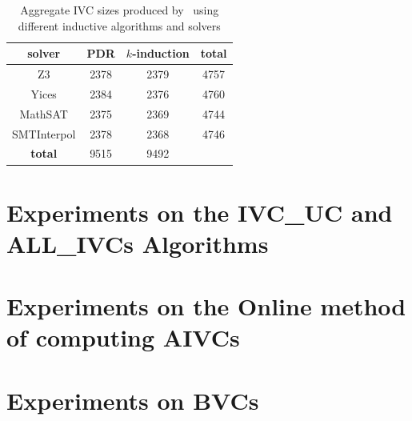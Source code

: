 
\begin{table}
  \caption{Aggregate IVC sizes produced by \ucalg\ using different inductive algorithms and solvers}
  \centering
  \begin{tabular}{ |c|c|c|c| }
    \hline
     solver & PDR & $k$-induction & \textbf{total} \\
    \hline
      Z3 & 2378 & 2379 & 4757 \\
      Yices & 2384 & 2376 & 4760 \\
      MathSAT & 2375 & 2369 & 4744 \\
      SMTInterpol & 2378 & 2368 & 4746 \\
    \hline
      \textbf{total} & 9515 & 9492 &   \\
    \hline
  \end{tabular}
  \label{tab:minimality-algorithm-solvers}
\end{table}



\section{Experiments on the IVC\_UC and ALL\_IVCs Algorithms}
\label{sec:exp1}


\section{Experiments on the Online method of computing AIVCs}
\label{sec:exp2}



\section{Experiments on BVCs}
\label{sec:exp3}

